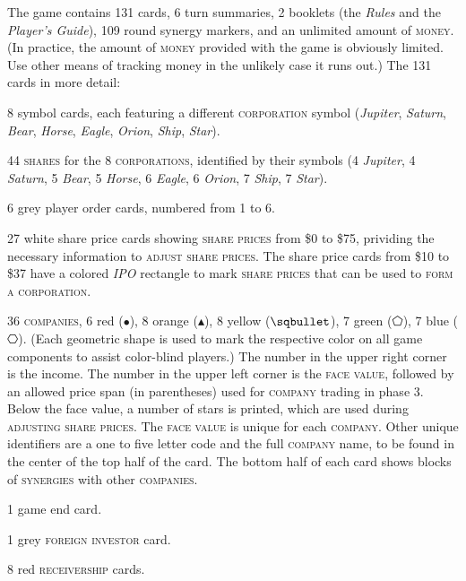 \documentclass[11pt,a4paper]{article}
\newenvironment{my_itemize}
{\begin{list}{\labelitemi}{\leftmargin=1.2em}
  \setlength{\itemsep}{1pt}
  \setlength{\parskip}{0pt}
  \setlength{\parsep}{0pt}}
{\end{list}}
\begin{document}
\begin{multicols}{2}
{The game contains 131 cards, 6 turn summaries, 2 booklets (the
\emph{Rules} and the \emph{Player's Guide}), 109 round synergy
markers, and an unlimited amount of \textsc{money}. (In practice, the
amount of \textsc{money} provided with the game is obviously
limited. Use other means of tracking money in the unlikely case it
runs out.) The 131 cards in more detail:
\begin{my_itemize}
\item 8 symbol cards, each featuring a different \textsc{corporation}
  symbol (\emph{Jupiter}, \emph{Saturn}, \emph{Bear}, \emph{Horse},
  \emph{Eagle}, \emph{Orion}, \emph{Ship}, \emph{Star}).
\item 44 \textsc{shares} for the 8 \textsc{corporations},
  identified by their symbols (4 \emph{Jupiter}, 4 \emph{Saturn}, 5
  \emph{Bear}, 5 \emph{Horse}, 6 \emph{Eagle}, 6 \emph{Orion}, 7
  \emph{Ship}, 7 \emph{Star}).
\item 6 grey player order cards, numbered from 1 to 6.
\item 27 white share price cards showing \textsc{share prices} from
  \$0 to \$75, prividing the necessary information to \textsc{adjust
    share prices}. The share price cards from \$10 to \$37 have a
  colored \emph{IPO} rectangle to mark \textsc{share prices} that can
  be used to \textsc{form a corporation}.
\item 36 \textsc{companies}, 6 red ($\bullet$), 8 orange
  ($\blacktriangleup$), 8 yellow ($\sqbullet$), 7 green ($\pentagon$),
  7 blue ($\hexagon$). (Each geometric shape is used to mark the
  respective color on all game components to assist color-blind
  players.) The number in the upper right corner is the income. The
  number in the upper left corner is the \textsc{face value}, followed
  by an allowed price span (in parentheses) used for \textsc{company}
  trading in phase 3. Below the face value, a number of stars is
  printed, which are used during \textsc{adjusting share prices}. The
  \textsc{face value} is unique for each \textsc{company}. Other
  unique identifiers are a one to five letter code and the full
  \textsc{company} name, to be found in the center of the top half of
  the card. The bottom half of each card shows blocks of
  \textsc{synergies} with other \textsc{companies}.
\item 1 game end card.
\item 1 grey \textsc{foreign investor} card.
\item 8 red \textsc{receivership} cards.
\end{my_itemize}

}
\end{multicols}
\end{document}
